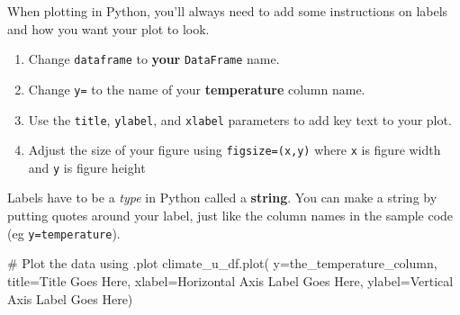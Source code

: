 \documentclass[
  letterpaper,
  DIV=11,
  numbers=noendperiod,
  oneside]{scrreprt}
\newenvironment{Shaded}{\begin{snugshade}}{\end{snugshade}}
\newcommand{\CommentTok}[1]{\textcolor[rgb]{0.37,0.37,0.37}{#1}}
\newcommand{\NormalTok}[1]{\textcolor[rgb]{0.00,0.23,0.31}{#1}}
\newcommand{\OperatorTok}[1]{\textcolor[rgb]{0.37,0.37,0.37}{#1}}
\newcommand{\StringTok}[1]{\textcolor[rgb]{0.13,0.47,0.30}{#1}}
\providecommand{\tightlist}{%
  \setlength{\itemsep}{0pt}\setlength{\parskip}{0pt}}
\begin{document}
When plotting in Python, you'll always need to add some instructions on
labels and how you want your plot to look.

\begin{tcolorbox}[enhanced jigsaw, colbacktitle=quarto-callout-color!10!white, opacityback=0, bottomtitle=1mm, toptitle=1mm, bottomrule=.15mm, left=2mm, colframe=quarto-callout-color-frame, leftrule=.75mm, opacitybacktitle=0.6, colback=white, rightrule=.15mm, toprule=.15mm, breakable, titlerule=0mm, title=\textcolor{quarto-callout-color}{\faInfo}\hspace{0.5em}{Try It: Plot your data}, coltitle=black, arc=.35mm]

\begin{enumerate}
\def\labelenumi{\arabic{enumi}.}
\tightlist
\item
  Change \texttt{dataframe} to \textbf{your} \texttt{DataFrame} name.
\item
  Change \texttt{y=} to the name of your \textbf{temperature} column
  name.
\item
  Use the \texttt{title}, \texttt{ylabel}, and \texttt{xlabel}
  parameters to add key text to your plot.
\item
  Adjust the size of your figure using \texttt{figsize=(x,y)} where
  \texttt{x} is figure width and \texttt{y} is figure height
\end{enumerate}

\end{tcolorbox}

\begin{tcolorbox}[enhanced jigsaw, colbacktitle=quarto-callout-tip-color!10!white, opacityback=0, bottomtitle=1mm, toptitle=1mm, bottomrule=.15mm, left=2mm, colframe=quarto-callout-tip-color-frame, leftrule=.75mm, opacitybacktitle=0.6, colback=white, rightrule=.15mm, toprule=.15mm, breakable, titlerule=0mm, title=\textcolor{quarto-callout-tip-color}{\faLightbulb}\hspace{0.5em}{Tip}, coltitle=black, arc=.35mm]

Labels have to be a \emph{type} in Python called a \textbf{string}. You
can make a string by putting quotes around your label, just like the
column names in the sample code (eg
\texttt{y=\textquotesingle{}temperature\textquotesingle{}}).

\end{tcolorbox}

\begin{Shaded}
\begin{Highlighting}[]
\CommentTok{\# Plot the data using .plot}
\NormalTok{climate\_u\_df.plot(}
\NormalTok{    y}\OperatorTok{=}\StringTok{\textquotesingle{}the\_temperature\_column\textquotesingle{}}\NormalTok{,}
\NormalTok{    title}\OperatorTok{=}\StringTok{\textquotesingle{}Title Goes Here\textquotesingle{}}\NormalTok{,}
\NormalTok{    xlabel}\OperatorTok{=}\StringTok{\textquotesingle{}Horizontal Axis Label Goes Here\textquotesingle{}}\NormalTok{,}
\NormalTok{    ylabel}\OperatorTok{=}\StringTok{\textquotesingle{}Vertical Axis Label Goes Here\textquotesingle{}}\NormalTok{)}
\end{Highlighting}
\end{Shaded}
\end{document}
